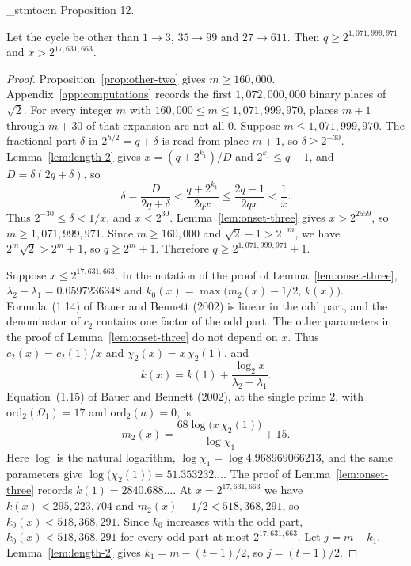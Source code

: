 \documentclass[11pt]{article}
\newenvironment{named}[1]{%
  \par\addvspace{\medskipamount}%
  \pagebreak[3]%
  \noindent{\bfseries #1}\space\ignorespaces
  \stmtoc{#1}%
}{\par\addvspace{\medskipamount}}
\newcommand{\stmtoc}[1]{ \qn_stmtoc:n {#1} }
\newcounter{lemmaref}
\newcommand{\marklemma}[2]{%
  \setcounter{lemmaref}{#1}%
  \addtocounter{lemmaref}{-1}%
  \refstepcounter{lemmaref}%
  \label{#2}%
}
\begin{document}
\begin{named}{Proposition 12.}
\marklemma{12}{prop:scan-x}
Let the cycle be other than $1 \to 3$, $35 \to 99$ and $27 \to 611$.
Then $q \ge 2^{1{,}071{,}999{,}971}$ and $x > 2^{17{,}631{,}663}$.
\end{named}

\begin{proof}
Proposition~\ref{prop:other-two} gives $m \ge 160{,}000$.
Appendix~\ref{app:computations} records the first $1{,}072{,}000{,}000$ binary places of $\sqrt{2}$.
For every integer $m$ with $160{,}000 \le m \le 1{,}071{,}999{,}970$, places $m+1$ through $m+30$ of that expansion are not all $0$.
Suppose $m \le 1{,}071{,}999{,}970$.
The fractional part $\delta$ in $2^{h/2} = q + \delta$ is read from place $m+1$, so $\delta \ge 2^{-30}$.
Lemma~\ref{lem:length-2} gives $x = (q + 2^{k_1})/D$ and $2^{k_1} \le q - 1$, and $D = \delta(2q + \delta)$, so
\[
\delta = \frac{D}{2q + \delta} < \frac{q + 2^{k_1}}{2qx} \le \frac{2q - 1}{2qx} < \frac{1}{x}.
\]
Thus $2^{-30} \le \delta < 1/x$, and $x < 2^{30}$.
Lemma~\ref{lem:onset-three} gives $x > 2^{2559}$, so $m \ge 1{,}071{,}999{,}971$.
Since $m \ge 160{,}000$ and $\sqrt{2} - 1 > 2^{-m}$, we have $2^m \sqrt{2} > 2^m + 1$, so $q \ge 2^m + 1$.
Therefore $q \ge 2^{1{,}071{,}999{,}971} + 1$.

Suppose $x \le 2^{17{,}631{,}663}$.
In the notation of the proof of Lemma~\ref{lem:onset-three}, $\lambda_2 - \lambda_1 = 0.0597236348$ and $k_0(x) = \max\bigl(m_2(x) - 1/2,\, k(x)\bigr)$.
Formula~(1.14) of Bauer and Bennett (2002) is linear in the odd part, and the denominator of $c_2$ contains one factor of the odd part.
The other parameters in the proof of Lemma~\ref{lem:onset-three} do not depend on $x$.
Thus $c_2(x) = c_2(1)/x$ and $\chi_2(x) = x\, \chi_2(1)$, and
\[
k(x) = k(1) + \frac{\log_2 x}{\lambda_2 - \lambda_1}.
\]
Equation~(1.15) of Bauer and Bennett (2002), at the single prime $2$, with $\mathrm{ord}_2(\Omega_1) = 17$ and $\mathrm{ord}_2(a) = 0$, is
\[
m_2(x) = \frac{68 \log\bigl(x\, \chi_2(1)\bigr)}{\log \chi_1} + 15.
\]
Here $\log$ is the natural logarithm, $\log \chi_1 = \log 4.968969066213$, and the same parameters give $\log\bigl(\chi_2(1)\bigr) = 51.353232\ldots$.
The proof of Lemma~\ref{lem:onset-three} records $k(1) = 2840.688\ldots$.
At $x = 2^{17{,}631{,}663}$ we have $k(x) < 295{,}223{,}704$ and $m_2(x) - 1/2 < 518{,}368{,}291$, so $k_0(x) < 518{,}368{,}291$.
Since $k_0$ increases with the odd part, $k_0(x) < 518{,}368{,}291$ for every odd part at most $2^{17{,}631{,}663}$.
Let $j = m - k_1$.
Lemma~\ref{lem:length-2} gives $k_1 = m - (t - 1)/2$, so $j = (t - 1)/2$.


\end{proof}
\end{document}
